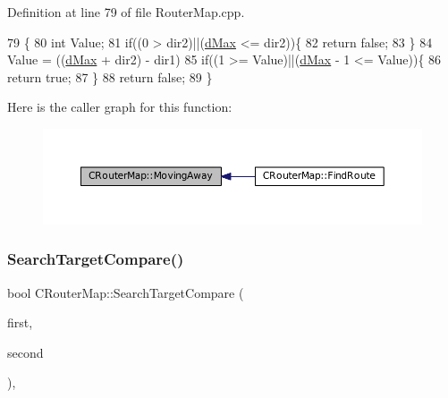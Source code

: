 Definition at line 79 of file Router\+Map.\+cpp.


\begin{DoxyCode}
79                                                            \{
80     \textcolor{keywordtype}{int} Value;
81     \textcolor{keywordflow}{if}((0 > dir2)||(\hyperlink{GameDataTypes_8h_acb2b033915f6659a71a38b5aa6e4eb42af6546049275557ce0ade2ceee042a319}{dMax} <= dir2))\{
82         \textcolor{keywordflow}{return} \textcolor{keyword}{false};    
83     \}
84     Value = ((\hyperlink{GameDataTypes_8h_acb2b033915f6659a71a38b5aa6e4eb42af6546049275557ce0ade2ceee042a319}{dMax} + dir2) - dir1) %
85     \textcolor{keywordflow}{if}((1 >= Value)||(\hyperlink{GameDataTypes_8h_acb2b033915f6659a71a38b5aa6e4eb42af6546049275557ce0ade2ceee042a319}{dMax} - 1 <= Value))\{
86         \textcolor{keywordflow}{return} \textcolor{keyword}{true};   
87     \}
88     \textcolor{keywordflow}{return} \textcolor{keyword}{false};
89 \}
\end{DoxyCode}
Here is the caller graph for this function\+:
\nopagebreak
\begin{figure}[H]
\begin{center}
\leavevmode
\includegraphics[width=350pt]{classCRouterMap_adf9041b4e1face1308c556c0ba0de9af_icgraph}
\end{center}
\end{figure}
\hypertarget{classCRouterMap_a1a581c85a34b6d0fcc5ddc3d0ae7fb00}{}\label{classCRouterMap_a1a581c85a34b6d0fcc5ddc3d0ae7fb00} 
\subsubsection{\texorpdfstring{Search\+Target\+Compare()}{SearchTargetCompare()}}
{\footnotesize\ttfamily bool C\+Router\+Map\+::\+Search\+Target\+Compare (\begin{DoxyParamCaption}\item[{const \hyperlink{structCRouterMap_1_1SSearchTarget}{S\+Search\+Target} \&}]{first,  }\item[{const \hyperlink{structCRouterMap_1_1SSearchTarget}{S\+Search\+Target} \&}]{second }\end{DoxyParamCaption})\hspace{0.3cm}{\ttfamily [static]}, {\ttfamily [protected]}}



